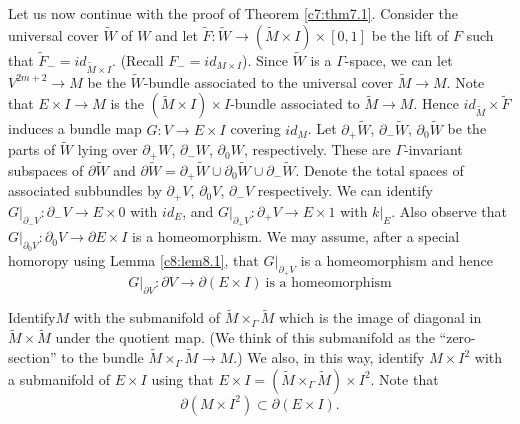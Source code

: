 Let us now continue with the proof of Theorem
\ref{c7:thm7.1}. Consider the universal cover $\tilde{W}$ of $W$ and
let $\tilde{F}: \tilde{W} \to (\tilde{M} \times I) \times [0, 1]$ be
the lift of $F$ such that $\tilde{F}_- = id_{\tilde{M} \times
  I}$. (Recall $F_- = id_{M \times I}$). Since $\tilde{W}$ is a
$\Gamma$-space, we can let $V^{2m+2}\to M$ be the $\tilde{W}$-bundle
associated to the universal cover $\tilde{M} \to M$. Note that $E
\times I \to M$ is the $(\tilde{M} \times I)\times I$-bundle
associated to $\tilde{M} \to M$. Hence $id_{\tilde{M}} \times
\tilde{F}$ induces a bundle map $G : V \to E \times I$ covering
$id_M$. Let $\partial_+ \tilde{W}$, $\partial_- \tilde{W}$,
$\partial_0 \tilde{W}$ be the parts of $\tilde{W}$ lying over
$\partial_+ W$, $\partial_- W$, $\partial_0 W$, respectively. These
are $\Gamma$-invariant subspaces of $\partial \tilde{W}$ and $\partial
\tilde{W}= \partial _+ \tilde{W} \cup \partial_0 \tilde{W} \cup
\partial _- \tilde{W}$. Denote the total spaces of associated
  subbundles by $\partial_+ V$, $\partial_0 V$, $\partial_- V$ 
  respectively. We can identify $G|_{\partial_- V}:\partial_{-}V\to
  E\times 0$
  with $id_E$, and $G|_{\partial_+ V} : \partial_+ V \to E \times 1$
  with $k|_{E}$. Also observe that $G|_{\partial_0 V}: \partial_0 V
  \to \partial E \times I$ is a homeomorphism. We may assume, after a
  special homoropy using Lemma \ref{c8:lem8.1}, that $G|_{\partial_+
    V}$ is a homeomorphism and hence
\begin{equation*}
  G|_{\partial V}: \partial V \to \partial (E \times I) ~\text{is a
    homeomorphism}\tag{1}\label{c8:eq1} 
\end{equation*}
 
Identify\pageoriginale $M$ with the submanifold of $\tilde{M} \times_\Gamma
\tilde{M}$ which is the image of diagonal in $\tilde{M} \times
\tilde{M}$ under the quotient map. (We think of this submanifold as
the ``zero-section'' to the bundle $\tilde{M} \times_\Gamma \tilde{M}
\to M$.) We also, in this way, identify $M \times I^2$ with a
submanifold of $E \times I$ using that $E \times I = (\tilde{M} \times_\Gamma \tilde{M}) \times I^2$. Note that
\begin{equation*}
  \partial (M \times I^2) \subset \partial (E \times
  I). \tag{2}\label{c8:eq2} 
\end{equation*}

